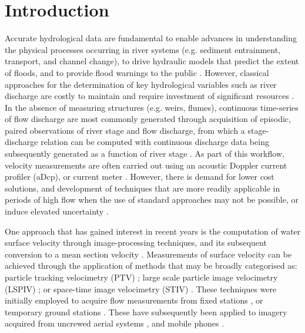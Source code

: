 \documentclass[hess, manuscript]{copernicus}
\begin{document}
\section{Introduction}
Accurate hydrological data are fundamental to enable advances in understanding the physical processes occurring in river systems (e.g. sediment entrainment, transport, and channel change), to drive hydraulic models that predict the extent of floods, and to provide flood warnings to the public \citep{McMillan2017,Tauro2018}. However, classical approaches for the determination of key hydrological variables such as river discharge are costly to maintain and require investment of significant resources \citep{Fekete2007}. In the absence of measuring structures (e.g. weirs, flumes), continuous time-series of flow discharge are most commonly generated through acquisition of episodic, paired observations of river stage and flow discharge, from which a stage-discharge relation can be computed with continuous discharge data being subsequently generated as a function of river stage \citep{Kiang2018}. As part of this workflow, velocity measurements are often carried out using an acoustic Doppler current profiler (aDcp), or current meter \citep{Herschy2014}. However, there is demand for lower cost solutions, and development of techniques that are more readily applicable in periods of high flow when the use of standard approaches may not be possible, or induce elevated uncertainty \citep{Kidson2005, Baldassarre2009}. 

One approach that has gained interest in recent years is the computation of water surface velocity through image-processing techniques, and its subsequent conversion to a mean section velocity \citep{Jolley2021}. Measurements of surface velocity can be achieved through the application of methods that may be broadly categorised as: particle tracking velocimetry (PTV) \citep{Brevis2011,Tauro2017b}; large scale particle image velocimetry (LSPIV) \citep{Fujita1998, Muste2008}; or space-time image velocimetry (STIV) \citep{Fujita2007}. These techniques were initially employed to acquire flow measurements from fixed stations \citep{Bradley2002,Hauet2008,Stumpf2016}, or temporary ground stations \citep{Jodeau2008, Kim2008, Dramais2011}. These have subsequently been applied to imagery acquired from uncrewed aerial systems \citep[e.g., ][]{Lewis2018, Masafu2022}, and mobile phones \citep[e.g., DischargeApp; ][]{Haro2021}. 
\end{document}
